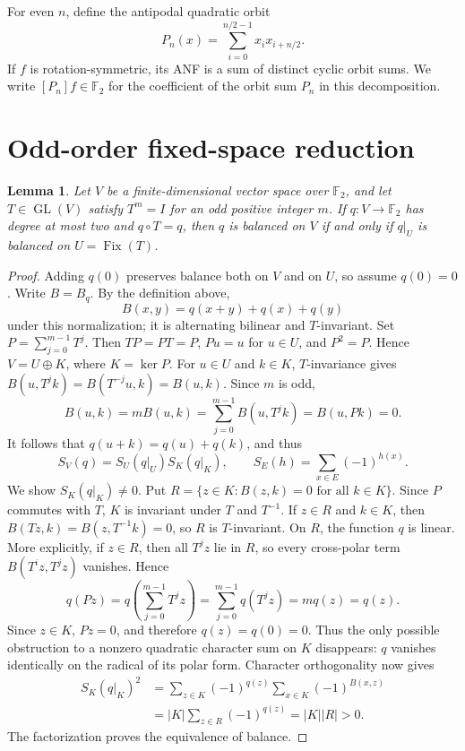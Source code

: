 \documentclass[11pt,a4paper]{article}
\newtheorem{lemma}[theorem]{Lemma}
\theoremstyle{remark}
\theoremstyle{plain}
\newcommand{\F}{\mathbb F_2}
\newcommand{\Fix}{\operatorname{Fix}}
\begin{document}
For even $n$, define the antipodal quadratic orbit
\[
P_n(x)=\sum_{i=0}^{n/2-1}x_i x_{i+n/2}.
\]
If $f$ is rotation-symmetric, its ANF is a sum of distinct cyclic orbit sums. We write $[P_n]f\in\F$ for the coefficient of the orbit sum $P_n$ in this decomposition.

\section{Odd-order fixed-space reduction}
\begin{lemma}\label{lem:reduction}
Let $V$ be a finite-dimensional vector space over $\F$, and let $T\in\operatorname{GL}(V)$ satisfy $T^m=I$ for an odd positive integer $m$. If $q:V\to\F$ has degree at most two and $q\circ T=q$, then $q$ is balanced on $V$ if and only if $q|_U$ is balanced on $U=\Fix(T)$.
\end{lemma}
\begin{proof}
Adding $q(0)$ preserves balance both on $V$ and on $U$, so assume $q(0)=0$. Write $B=B_q$. By the definition above,
\[
B(x,y)=q(x+y)+q(x)+q(y)
\]
under this normalization; it is alternating bilinear and $T$-invariant. Set $P=\sum_{j=0}^{m-1}T^j$. Then $TP=PT=P$, $Pu=u$ for $u\in U$, and $P^2=P$. Hence $V=U\oplus K$, where $K=\ker P$. For $u\in U$ and $k\in K$, $T$-invariance gives $B(u,T^jk)=B(T^{-j}u,k)=B(u,k)$. Since $m$ is odd,
\[
B(u,k)=mB(u,k)=\sum_{j=0}^{m-1}B(u,T^jk)=B(u,Pk)=0.
\]
It follows that $q(u+k)=q(u)+q(k)$, and thus
\[S_V(q)=S_U(q|_U)S_K(q|_K),\qquad S_E(h)=\sum_{x\in E}(-1)^{h(x)}.\]
We show $S_K(q|_K)\ne0$. Put $R=\{z\in K:B(z,k)=0\text{ for all }k\in K\}$. Since $P$ commutes with $T$, $K$ is invariant under $T$ and $T^{-1}$. If $z\in R$ and $k\in K$, then $B(Tz,k)=B(z,T^{-1}k)=0$, so $R$ is $T$-invariant. On $R$, the function $q$ is linear. More explicitly, if $z\in R$, then all $T^jz$ lie in $R$, so every cross-polar term $B(T^iz,T^jz)$ vanishes. Hence
\[
q(Pz)=q\!\left(\sum_{j=0}^{m-1}T^jz\right)
     =\sum_{j=0}^{m-1}q(T^jz)
     =m q(z)=q(z).
\]
Since $z\in K$, $Pz=0$, and therefore $q(z)=q(0)=0$.
Thus the only possible obstruction to a nonzero quadratic character sum on $K$ disappears: $q$ vanishes identically on the radical of its polar form. Character orthogonality now gives
\begin{align*}
 S_K(q|_K)^2
 &=\sum_{z\in K}(-1)^{q(z)}\sum_{x\in K}(-1)^{B(x,z)}\\
 &=|K|\sum_{z\in R}(-1)^{q(z)}=|K||R|>0.
\end{align*}
The factorization proves the equivalence of balance.
\end{proof}
\end{document}
